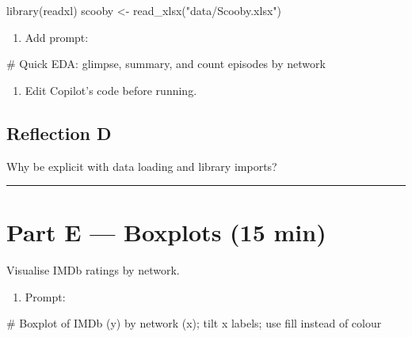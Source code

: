 \documentclass[
  letterpaper,
  DIV=11,
  numbers=noendperiod]{scrreprt}
\newenvironment{Shaded}{\begin{snugshade}}{\end{snugshade}}
\newcommand{\CommentTok}[1]{\textcolor[rgb]{0.37,0.37,0.37}{#1}}
\newcommand{\FunctionTok}[1]{\textcolor[rgb]{0.28,0.35,0.67}{#1}}
\newcommand{\NormalTok}[1]{\textcolor[rgb]{0.00,0.23,0.31}{#1}}
\newcommand{\OtherTok}[1]{\textcolor[rgb]{0.00,0.23,0.31}{#1}}
\newcommand{\StringTok}[1]{\textcolor[rgb]{0.13,0.47,0.30}{#1}}
\providecommand{\tightlist}{%
  \setlength{\itemsep}{0pt}\setlength{\parskip}{0pt}}
\begin{document}
\begin{Shaded}
\begin{Highlighting}[]
\FunctionTok{library}\NormalTok{(readxl)}
\NormalTok{scooby }\OtherTok{\textless{}{-}} \FunctionTok{read\_xlsx}\NormalTok{(}\StringTok{"data/Scooby.xlsx"}\NormalTok{)}
\end{Highlighting}
\end{Shaded}

\begin{enumerate}
\def\labelenumi{\arabic{enumi}.}
\setcounter{enumi}{2}
\tightlist
\item
  Add prompt:
\end{enumerate}

\begin{Shaded}
\begin{Highlighting}[]
\CommentTok{\# Quick EDA: glimpse, summary, and count episodes by network}
\end{Highlighting}
\end{Shaded}

\begin{enumerate}
\def\labelenumi{\arabic{enumi}.}
\setcounter{enumi}{3}
\tightlist
\item
  Edit Copilot's code before running.
\end{enumerate}

\subsection{Reflection D}\label{reflection-d}

Why be explicit with data loading and library imports?

\begin{center}\rule{0.5\linewidth}{0.5pt}\end{center}

\section{Part E --- Boxplots (15 min)}\label{part-e-boxplots-15-min}

Visualise IMDb ratings by network.

\begin{enumerate}
\def\labelenumi{\arabic{enumi}.}
\tightlist
\item
  Prompt:
\end{enumerate}

\begin{Shaded}
\begin{Highlighting}[]
\CommentTok{\# Boxplot of IMDb (y) by network (x); tilt x labels; use fill instead of colour}
\end{Highlighting}
\end{Shaded}
\end{document}
